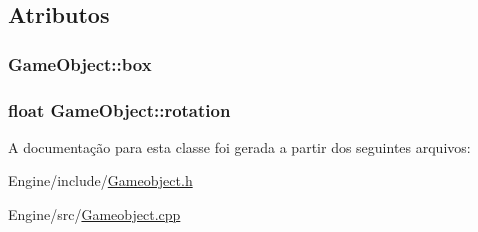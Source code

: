 \subsection{Atributos}
\hypertarget{classGameObject_ac8df90f2a6d41693cd7938e392ff6d0b}{
\subsubsection[{box}]{ Game\+Object\+::box}}\label{classGameObject_ac8df90f2a6d41693cd7938e392ff6d0b}
\hypertarget{classGameObject_ac55f6ebdf4cfbab508680ad7290fb26c}{
\subsubsection[{rotation}]{\setlength{\rightskip}{0pt plus 5cm}float Game\+Object\+::rotation}}\label{classGameObject_ac55f6ebdf4cfbab508680ad7290fb26c}


A documentação para esta classe foi gerada a partir dos seguintes arquivos\+:\begin{DoxyCompactItemize}
\item 
Engine/include/\hyperlink{Gameobject_8h}{Gameobject.\+h}\item 
Engine/src/\hyperlink{Gameobject_8cpp}{Gameobject.\+cpp}\end{DoxyCompactItemize}
